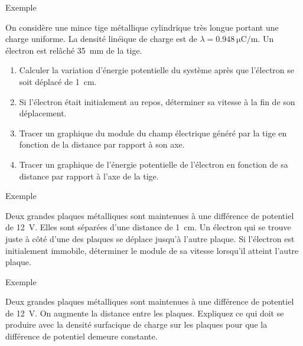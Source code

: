 \documentclass{beamer}
\begin{document}
\begin{frame}[t]{Exemple}

On considère une mince tige métallique cylindrique très longue portant une
charge uniforme.  La densité linéique de charge est de $\lambda =
\SI{0.948}{\micro\coulomb\per\meter}$. Un électron est relâché \SI{35}{mm}
de la tige.

\begin{enumerate}
  \item Calculer la variation d'énergie potentielle du système après que
    l'électron se soit déplacé de \SI{1}{cm}.
  \item Si l'électron était initialement au repos, déterminer sa vitesse à la
    fin de son déplacement.
  \item Tracer un graphique du module du champ électrique généré par la tige en
    fonction de la distance par rapport à son axe.
  \item Tracer un graphique de l'énergie potentielle de l'électron en fonction
    de sa distance par rapport à l'axe de la tige.
\end{enumerate}

\end{frame}


\begin{frame}{Exemple}

Deux grandes plaques métalliques sont maintenues à une différence de potentiel
de \SI{12}{V}. Elles sont séparées d'une distance de \SI{1}{cm}. Un électron
qui se trouve juste à côté d'une des plaques se déplace jusqu'à l'autre plaque.
Si l'électron est initialement immobile, déterminer le module de sa vitesse
lorsqu'il atteint l'autre plaque.

\end{frame}



\begin{frame}{Exemple}

Deux grandes plaques métalliques sont maintenues à une différence de potentiel
de \SI{12}{V}. On augmente la distance entre les plaques. Expliquez ce qui doit
se produire avec la densité surfacique de charge sur les plaques pour que la
différence de potentiel demeure constante.

\end{frame}
\end{document}
